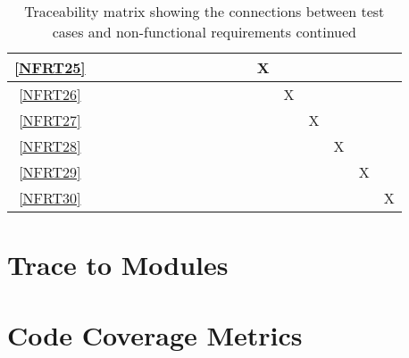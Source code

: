 \documentclass[12pt, titlepage]{article}
\begin{document}
\begin{landscape}
\begin{table}[h!]
\begin{tabular}{|c|c|c|c|c|c|c|c|c|c|c|c|c|c|c|c|c|c|}
      \ref{NFRT25} &      &      &     &     &     &     &     &     &     &     &     & X   &     &     &     &     &     \\ \hline
      \ref{NFRT26} &      &      &     &     &     &     &     &     &     &     &     &     & X   &     &     &     &     \\ \hline
      \ref{NFRT27} &      &      &     &     &     &     &     &     &     &     &     &     &     & X   &     &     &     \\ \hline
      \ref{NFRT28} &      &      &     &     &     &     &     &     &     &     &     &     &     &     & X   &     &     \\ \hline
      \ref{NFRT29} &      &      &     &     &     &     &     &     &     &     &     &     &     &     &     & X   &     \\ \hline
      \ref{NFRT30} &      &      &     &     &     &     &     &     &     &     &     &     &     &     &     &     & X   \\ \hline
    \end{tabular}
    \caption{Traceability matrix showing the connections between test cases
      and non-functional requirements continued}
    \label{tab:nfrt2}
  \end{table}
\end{landscape}
\restoregeometry

\section{Trace to Modules}		

\section{Code Coverage Metrics}
\end{document}
